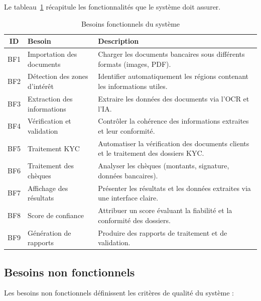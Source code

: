 Le tableau~\ref{tab:besoins_fonctionnels} récapitule les fonctionnalités que
le système doit assurer.

\begin{table}[H]
\centering
\label{tab:besoins_fonctionnels}
\begin{tabular}{|c|l|p{7.5cm}|}
\hline
\textbf{ID} & \textbf{Besoin} & \textbf{Description} \\
\hline
BF1 & Importation des documents & Charger les documents bancaires sous différents formats (images, PDF). \\
\hline
BF2 & Détection des zones d'intérêt & Identifier automatiquement les régions contenant les informations utiles. \\
\hline
BF3 & Extraction des informations & Extraire les données des documents via l'OCR et l'IA. \\
\hline
BF4 & Vérification et validation & Contrôler la cohérence des informations extraites et leur conformité. \\
\hline
BF5 & Traitement KYC & Automatiser la vérification des documents clients et le traitement des dossiers KYC. \\
\hline
BF6 & Traitement des chèques & Analyser les chèques (montants, signature, données bancaires). \\
\hline
BF7 & Affichage des résultats & Présenter les résultats et les données extraites via une interface claire. \\
\hline
BF8 & Score de confiance & Attribuer un score évaluant la fiabilité et la conformité des dossiers. \\
\hline
BF9 & Génération de rapports & Produire des rapports de traitement et de validation. \\
\hline
\end{tabular}
\caption{Besoins fonctionnels du système}
\end{table}

\subsection*{Besoins non fonctionnels}

Les besoins non fonctionnels définissent les critères de qualité du système :

